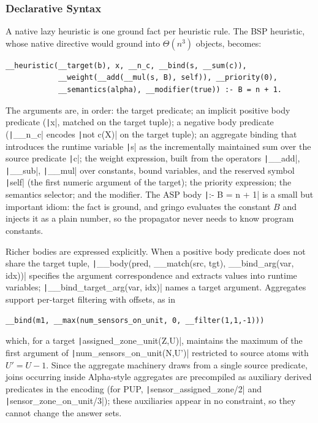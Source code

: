 \subsubsection{Declarative Syntax}

A native lazy heuristic is one ground fact per heuristic rule. The BSP heuristic, whose native directive would ground into $\Theta(n^3)$ objects, becomes:

\begin{verbatim}
__heuristic(__target(b), x, __n_c, __bind(s, __sum(c)),
            __weight(__add(__mul(s, B), self)), __priority(0),
            __semantics(alpha), __modifier(true)) :- B = n + 1.
\end{verbatim}

The arguments are, in order: the target predicate; an implicit positive body predicate (\texttt|x|, matched on the target tuple); a negative body predicate (\texttt|__n_c| encodes \texttt|not c(X)| on the target tuple); an aggregate binding that introduces the runtime variable \texttt|s| as the incrementally maintained sum over the source predicate \texttt|c|; the weight expression, built from the operators \texttt|__add|, \texttt|__sub|, \texttt|__mul| over constants, bound variables, and the reserved symbol \texttt|self| (the first numeric argument of the target); the priority expression; the semantics selector; and the modifier. The ASP body \texttt|:- B = n + 1| is a small but important idiom: the fact is ground, and gringo evaluates the constant $B$ and injects it as a plain number, so the propagator never needs to know program constants.

Richer bodies are expressed explicitly. When a positive body predicate does not share the target tuple, \texttt|__body(pred, __match(src, tgt), __bind_arg(var, idx))| specifies the argument correspondence and extracts values into runtime variables; \texttt|__bind_target_arg(var, idx)| names a target argument. Aggregates support per-target filtering with offsets, as in

\begin{verbatim}
__bind(m1, __max(num_sensors_on_unit, 0, __filter(1,1,-1)))
\end{verbatim}

which, for a target \texttt|assigned_zone_unit(Z,U)|, maintains the maximum of the first argument of \texttt|num_sensors_on_unit(N,U')| restricted to source atoms with $U' = U - 1$. Since the aggregate machinery draws from a single source predicate, joins occurring inside Alpha-style aggregates are precompiled as auxiliary derived predicates in the encoding (for PUP, \texttt|sensor_assigned_zone/2| and \texttt|sensor_zone_on_unit/3|); these auxiliaries appear in no constraint, so they cannot change the answer sets.

